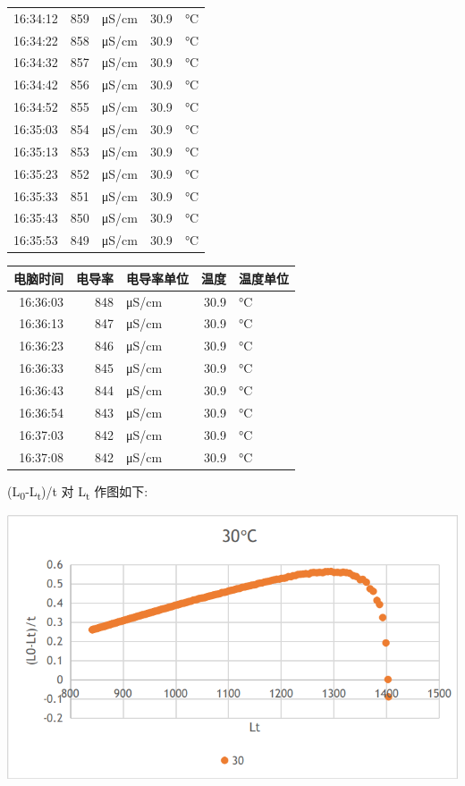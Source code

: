 \documentclass[11pt]{article}
\begin{document}
\begin{enumerate}
\begin{center}
\begin{tabular}{rrlrl}
16:34:12 & 859 & μS/cm & 30.9 & °C\\
16:34:22 & 858 & μS/cm & 30.9 & °C\\
16:34:32 & 857 & μS/cm & 30.9 & °C\\
16:34:42 & 856 & μS/cm & 30.9 & °C\\
16:34:52 & 855 & μS/cm & 30.9 & °C\\
16:35:03 & 854 & μS/cm & 30.9 & °C\\
16:35:13 & 853 & μS/cm & 30.9 & °C\\
16:35:23 & 852 & μS/cm & 30.9 & °C\\
16:35:33 & 851 & μS/cm & 30.9 & °C\\
16:35:43 & 850 & μS/cm & 30.9 & °C\\
16:35:53 & 849 & μS/cm & 30.9 & °C\\
\end{tabular}
\end{center}

\begin{center}
\begin{tabular}{rrlrl}
电脑时间 & 电导率 & 电导率单位 & 温度 & 温度单位\\
\hline
16:36:03 & 848 & μS/cm & 30.9 & °C\\
16:36:13 & 847 & μS/cm & 30.9 & °C\\
16:36:23 & 846 & μS/cm & 30.9 & °C\\
16:36:33 & 845 & μS/cm & 30.9 & °C\\
16:36:43 & 844 & μS/cm & 30.9 & °C\\
16:36:54 & 843 & μS/cm & 30.9 & °C\\
16:37:03 & 842 & μS/cm & 30.9 & °C\\
16:37:08 & 842 & μS/cm & 30.9 & °C\\
\end{tabular}
\end{center}

(L\textsubscript{0}‐L\textsubscript{t})/t 对 L\textsubscript{t} 作图如下:
\begin{center}
\includegraphics[width=.9\linewidth]{../img/picture-30-1.png}
\end{center}
\end{enumerate}
\end{document}
